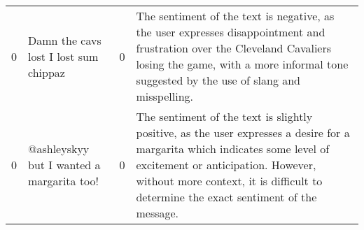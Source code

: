 \begin{tabular}{r{1cm} p{0.4in} r{1cm} p{0.4in}}
0 & Damn the cavs lost I lost sum chippaz  & 0 & The sentiment of the text is negative, as the user expresses disappointment and frustration over the Cleveland Cavaliers losing the game, with a more informal tone suggested by the use of slang and misspelling. \\
0 & @ashleyskyy but I wanted a margarita too!  & 0 & The sentiment of the text is slightly positive, as the user expresses a desire for a margarita which indicates some level of excitement or anticipation. However, without more context, it is difficult to determine the exact sentiment of the message. \\
\bottomrule
\end{tabular}
